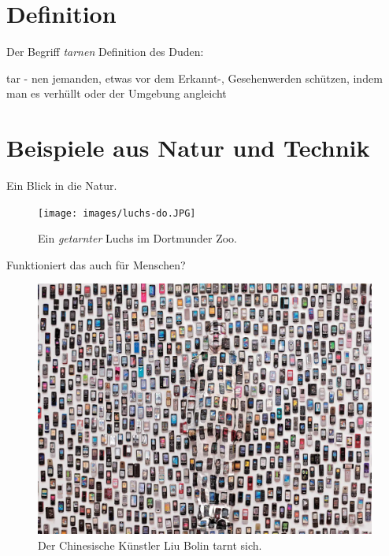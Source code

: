 \section{Definition}

\begin{frame}{Der Begriff \textit{tarnen}}
  Definition des Duden:
  \begin{block}{{\centering tar - nen}}
    jemanden, etwas vor dem Erkannt-, Gesehenwerden sch\"utzen,
    indem man es verh\"ullt oder der Umgebung angleicht
  \end{block}
\end{frame}

\section{Beispiele aus Natur und Technik}
\begin{frame}{Ein Blick in die Natur.}
  \begin{figure}
    \centering
    \caption{Ein \textit{getarnter} Luchs im Dortmunder Zoo.}
    \texttt{[image: images/luchs-do.JPG]}
  \end{figure}
\end{frame}

\begin{frame}{Funktioniert das auch f\"ur Menschen?}
  \begin{figure}
    \centering
    \caption{Der Chinesische K\"unstler Liu Bolin tarnt sich. \cite{humanhide}}
    \includegraphics[height=0.8\textheight]{images/liubolin.jpg}
  \end{figure}
\end{frame}

